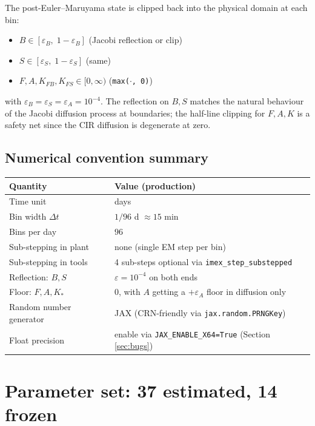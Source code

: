 \documentclass[11pt,a4paper]{article}
\theoremstyle{definition}
\begin{document}
The post-Euler--Maruyama state is clipped back into the physical
domain at each bin:

\begin{itemize}
  \item $B \in [\varepsilon_B,\; 1 - \varepsilon_B]$ (Jacobi reflection or clip)
  \item $S \in [\varepsilon_S,\; 1 - \varepsilon_S]$ (same)
  \item $F, A, K_{FB}, K_{FS} \in [0, \infty)$ (\texttt{max(\(\cdot\), 0)})
\end{itemize}

with $\varepsilon_B = \varepsilon_S = \varepsilon_A = 10^{-4}$. The
reflection on $B, S$ matches the natural behaviour of the Jacobi
diffusion process at boundaries; the half-line clipping for $F, A, K$
is a safety net since the CIR diffusion is degenerate at zero.

\subsection{Numerical convention summary}

\begin{center}\small
\begin{tabular}{ll}
\toprule
Quantity & Value (production) \\
\midrule
Time unit                 & days \\
Bin width $\Delta t$      & $1/96$ d $\approx 15$ min \\
Bins per day              & $96$ \\
Sub-stepping in plant     & none (single EM step per bin) \\
Sub-stepping in tools     & 4 sub-steps optional via \texttt{imex\_step\_substepped} \\
Reflection: $B, S$        & $\varepsilon = 10^{-4}$ on both ends \\
Floor: $F, A, K_*$        & $0$, with $A$ getting a $+\varepsilon_A$ floor in diffusion only \\
Random number generator   & JAX (CRN-friendly via \texttt{jax.random.PRNGKey}) \\
Float precision           & enable via \texttt{JAX\_ENABLE\_X64=True} (Section \ref{sec:bugs}) \\
\bottomrule
\end{tabular}
\end{center}


\section{Parameter set: 37 estimated, 14 frozen} \label{sec:pinning}
\end{document}
